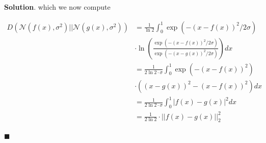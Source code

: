 \documentclass[12pt]{article}
\theoremstyle{definition}
\newenvironment{s}{%
        \begin{trivlist} \item \textbf{Solution}. }{%
            \hspace*{\fill} $\blacksquare$\end{trivlist}}%
\begin{document}
{\begin{s}
which we now compute

\begin{align*}
D(\mathcal{N}(f(x),\sigma^{2})||\mathcal{N}(g(x),\sigma^{2})) &= 
\frac{1}{\ln 2}\int_{0}^{1} \exp\left(-(x-f(x))^{2}/2\sigma\right)\\ &\cdot \ln \left(\frac{\exp\left(-(x-f(x))^{2}/2\sigma\right)}{\exp\left(-(x-g(x))^{2}/2\sigma\right)}\right)dx\\
&= \frac{1}{2\ln 2\cdot \sigma}\int_{0}^{1} \exp\left(-(x-f(x))^{2}\right)\\ &\cdot \left((x-g(x))^{2}-(x-f(x))^{2}\right)dx\\
&= \frac{1}{2\ln 2\cdot \sigma}\int_{0}^{1} |f(x)-g(x)|^{2}dx\\
&= \frac{1}{2\ln 2}\cdot ||f(x)-g(x)||_{2}^{2}\\
\end{align*}

\end{s}
\end{document}
